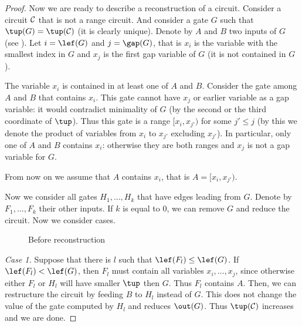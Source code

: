 \documentclass{toc}
\begin{document}
\begin{proof}[Proof]
    Now we are ready to describe a reconstruction of a circuit. Consider a circuit ${\cal C}$ that is not a range circuit. And consider a gate $G$ such that $\tup(G)=\tup({\cal C})$ (it is clearly unique). Denote by $A$ and $B$ two inputs of $G$ (see ). Let $i=\lef(G)$ and $j=\gap(G)$, that is $x_i$ is the variable with the smallest index in $G$ and $x_j$ is the first gap variable of $G$ (it is not contained in $G$).

    The variable $x_i$ is contained in at least one of $A$ and $B$. Consider the gate among $A$ and $B$ that contains $x_i$. This gate cannot have $x_j$ or earlier variable as a gap variable: it would contradict minimality of $G$ (by the second or the third coordinate of $\tup$). Thus this gate is a range $[x_i,x_{j'})$ for some $j'\leq j$ (by this we denote the product of variables from $x_i$ to $x_{j'}$ excluding $x_{j'}$). In particular, only one of $A$ and $B$ contains $x_i$: otherwise they are both ranges and $x_j$ is not a gap variable for $G$.

    From now on we assume that $A$ contains $x_i$, that is $A=[x_i,x_{j'})$.

    Now we consider all gates $H_1,\ldots, H_k$ that have edges leading from $G$. Denote by $F_1,\ldots, F_k$ their other inputs. If $k$ is equal to $0$, we can remove $G$ and reduce the circuit. Now we consider cases.

    \begin{figure}[ht]
        \begin{center}
        \end{center}
        \caption{Before reconstruction} \label{fig:before}
    \end{figure}

    \emph{Case 1.} Suppose that there is $l$ such that $\lef(F_l) \leq \lef(G)$. If $\lef(F_l) < \lef(G)$, then $F_l$ must contain all variables $x_i, \ldots, x_j$, since otherwise either $F_l$ or $H_l$ will have smaller $\tup$ then $G$. Thus $F_l$ contains $A$. Then, we can restructure the circuit by feeding $B$ to $H_l$ instead of $G$. This does not change the value of the gate computed by $H_l$ and reduces $\out(G)$. Thus $\tup({\cal C})$ increases and we are done.


\end{proof}
\end{document}
